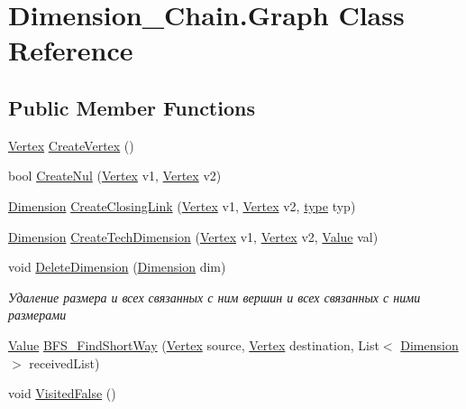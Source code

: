 \hypertarget{class_dimension___chain_1_1_graph}{}\section{Dimension\+\_\+\+Chain.\+Graph Class Reference}
\label{class_dimension___chain_1_1_graph}
\subsection*{Public Member Functions}
\begin{DoxyCompactItemize}
\item 
\mbox{\hyperlink{class_dimension___chain_1_1_vertex}{Vertex}} \mbox{\hyperlink{class_dimension___chain_1_1_graph_ac175fc4299e2577a99d7b6c197bae4d2}{Create\+Vertex}} ()
\item 
bool \mbox{\hyperlink{class_dimension___chain_1_1_graph_a7b424d53464cbb322db7944f2ad6bb7a}{Create\+Nul}} (\mbox{\hyperlink{class_dimension___chain_1_1_vertex}{Vertex}} v1, \mbox{\hyperlink{class_dimension___chain_1_1_vertex}{Vertex}} v2)
\item 
\mbox{\hyperlink{class_dimension___chain_1_1_dimension}{Dimension}} \mbox{\hyperlink{class_dimension___chain_1_1_graph_ada5a731ebbb09267d501292d27db32fc}{Create\+Closing\+Link}} (\mbox{\hyperlink{class_dimension___chain_1_1_vertex}{Vertex}} v1, \mbox{\hyperlink{class_dimension___chain_1_1_vertex}{Vertex}} v2, \mbox{\hyperlink{namespace_dimension___chain_a6ec9051138598c61cc00acf2547dced4}{type}} typ)
\item 
\mbox{\hyperlink{class_dimension___chain_1_1_dimension}{Dimension}} \mbox{\hyperlink{class_dimension___chain_1_1_graph_a2a5db4af48b7b6c7595a79912b47c81e}{Create\+Tech\+Dimension}} (\mbox{\hyperlink{class_dimension___chain_1_1_vertex}{Vertex}} v1, \mbox{\hyperlink{class_dimension___chain_1_1_vertex}{Vertex}} v2, \mbox{\hyperlink{class_dimension___chain_1_1_value}{Value}} val)
\item 
void \mbox{\hyperlink{class_dimension___chain_1_1_graph_a781ea9fd0f61ebf19698b1964b7a9f15}{Delete\+Dimension}} (\mbox{\hyperlink{class_dimension___chain_1_1_dimension}{Dimension}} dim)
\begin{DoxyCompactList}\small\item\em Удаление размера и всех связанных с ним вершин и всех связанных с ними размерами \end{DoxyCompactList}\item 
\mbox{\hyperlink{class_dimension___chain_1_1_value}{Value}} \mbox{\hyperlink{class_dimension___chain_1_1_graph_a3817dc05a66fc09a8655ac35a63434a2}{B\+F\+S\+\_\+\+Find\+Short\+Way}} (\mbox{\hyperlink{class_dimension___chain_1_1_vertex}{Vertex}} source, \mbox{\hyperlink{class_dimension___chain_1_1_vertex}{Vertex}} destination, List$<$ \mbox{\hyperlink{class_dimension___chain_1_1_dimension}{Dimension}} $>$ received\+List)
\item 
void \mbox{\hyperlink{class_dimension___chain_1_1_graph_af94dc71f4cffd52f1eba00301d9e450b}{Visited\+False}} ()
\end{DoxyCompactItemize}
